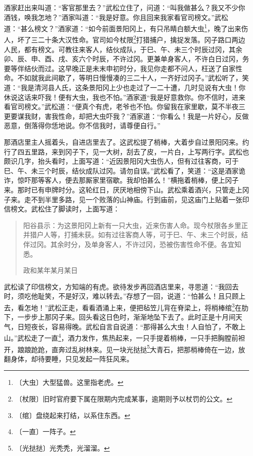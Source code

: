 \documentclass[12pt,UTF-8,openany]{ctexbook}
\begin{document}
\begin{normalsize}
    酒家赶出来叫道：“客官那里去？”武松立住了，问道：“叫我做甚么？我又不少你酒钱，唤我怎地？”酒家叫道：“我是好意。你且回来我家看官司榜文。”武松道：“甚么榜文？”酒家道：“如今前面景阳冈上，有只吊睛白额大虫\footnote{〔大虫〕大型猛兽。这里指老虎。}，晚了出来伤人，坏了三二十条大汉性命。官司如今杖限\footnote{〔杖限〕旧时官府要下属在限期内完成某事，逾期则予以杖罚的公文。}打猎捕户，擒捉发落。冈子路口两边人民，都有榜文。可教往来客人，结伙成队，于巳、午、未三个时辰过冈，其余卯、辰、申、酉、戌、亥六个时辰，不许过冈。更兼单身客人，不许白日过冈，务要等伴结伙而过。这早晚正是未末申初时分，我见你走都不问人，枉送了自家性命。不如就我此间歇了，等明日慢慢凑的三二十人，一齐好过冈子。”武松听了，笑道：“我是清河县人氏，这条景阳冈上少也走过了一二十遭，几时见说有大虫！你休说这话来吓我！便有大虫，我也不怕。”酒家道“我是好意救你。你不信时，进来看官司榜文。”武松道：“便真个有虎，老爷也不怕。你留我在家里歇，莫不半夜三更要谋我财，害我性命，却把大虫吓我？”酒家道：“你看么！我是一片好心，反做恶意，倒落得你恁地说。你不信我时，请尊便自行。”
    
    那酒店里主人摇着头，自进店里去了。这武松提了梢棒，大着步自过景阳冈来。约行了四五里路，来到冈子下，见一大树，刮去了皮，一片白，上写两行字。武松也颇识几字，抬头看时，上面写道：“近因景阳冈大虫伤人，但有过往客商，可于巳、午、未三个时辰，结伙成队过冈。请勿自误。”武松看了，笑道：“这是酒家诡诈，惊吓那等客人，便去那厮家里宿歇。我却怕甚么！”横拖着梢棒，便上冈子来。那时已有申牌时分。这轮红日，厌厌地相傍下山。武松乘着酒兴，只管走上冈子来。走不到半里多路，见一个败落的山神庙。行到庙前，见这庙门上贴着一张印信榜文。武松住了脚读时，上面写道：
    
    \begin{quotation}
    
    阳谷县示：为这景阳冈上新有一只大虫，近来伤害人命。现今杖限各乡里正并猎户人等，打捕未获。如有过往客商人等，可于巳、午、未三个时辰，结伴过冈。其余时分，及单身客人，不许过冈，恐被伤害性命不便。各宜知悉。
    
    \hfill 政和某年某月某日
    
    \end{quotation}
    
    武松读了印信榜文，方知端的有虎。欲待发步再回酒店里来，寻思道：“我回去时，须吃他耻笑，不是好汉，难以转去。”存想了一回，说道：“怕甚么！且只顾上去，看怎地！”武松正走，看看酒涌上来，便把毡笠儿背在脊梁上，将梢棒绾\footnote{〔绾〕盘绕起来打结，以系住东西。}在肋下，一步步上那冈子来。回头看这日色时，渐渐地坠下去了。此时正是十月间天气，日短夜长，容易得晚。武松自言自说道：“那得甚么大虫！人自怕了，不敢上山。”武松走了一直\footnote{〔一直〕一阵子。}，酒力发作，焦热起来，一只手提着梢棒，一只手把胸膛前袒开，踉踉跄跄，直奔过乱树林来。见一块光挞挞\footnote{〔光挞挞〕光秃秃，光溜溜。}大青石，把那梢棒倚在一边，放翻身体，却待要睡，只见发起一阵狂风来。
    

\end{normalsize}
\end{document}
